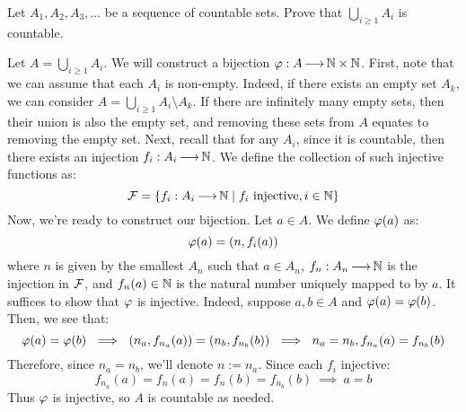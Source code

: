 \label{q1}
\begin{qu}[num=1]
    Let $ A_{1}, A_{2}, A_{3}, \dots $ be a sequence of countable sets.
    Prove that $ \bigcup_{i \geq 1} A_{i} $ is countable.
\end{qu}

\begin{soln}
    Let $ A = \bigcup_{i \geq 1} A_{i} $. 
    We will construct a bijection $ \operatorname{\varphi} : A \operatorname{\longrightarrow} \mathbb{N} \times \mathbb{N} $.
    \vsp
    First, note that we can assume that each $ A_{i} $ is non-empty.
    Indeed, if there exists an empty set $ A_{k} $, we can consider
    $ A = \bigcup_{i \geq 1} A_{i} \setminus A_{k} $.
    If there are infinitely many empty sets, then their union is also the empty
    set, and removing these sets from $ A $ equates to removing the empty set.
    \vsp
    Next, recall that for any $ A_{i} $, since it is countable,
    then there exists an injection $ f_{i} : A_{i} \operatorname{\longrightarrow} \mathbb{N} $.
    We define the collection of such injective functions as:
    \begin{equation*}
        \mathcal{F} = \left\{{f_{i} : A_{i} \operatorname{\longrightarrow} \mathbb{N} \mid
        f_{i} \textrm{ injective}, i \in \mathbb{N}}\right\}
    \end{equation*}
    Now, we're ready to construct our bijection.
    Let $ a \in A $. We define $ \operatorname{\varphi}(a) $ as:
    \begin{equation*}
        \operatorname{\varphi}(a) = (n, f_{i}(a))
    \end{equation*}
    where $ n $ is given by the smallest $ A_{n} $ such that $ a \in A_{n} $, 
    $ f_{n} : A_{n} \operatorname{\longrightarrow} \mathbb{N} $ is the injection in $ \mathcal{F} $, 
    and $ f_{n}(a) \in \mathbb{N} $ is the natural number uniquely mapped to by
    $ a $. It suffices to show that $ \operatorname{\varphi} $ is injective. \vsp
    Indeed, suppose $ a, b \in A $ and $ \operatorname{\varphi}(a) = \operatorname{\varphi}(b) $.
    Then, we see that:
    \begin{equation*}
        \vphi(a) = \vphi(b) \ \implies \ (n_{a}, f_{n_{a}}(a)) =
        (n_{b}, f_{n_{b}}(b)) \ \implies \ n_{a} = n_{b} , f_{n_{a}}(a)
        = f_{n_{b}}(b)
    \end{equation*}
    Therefore, since $ n_{a} = n_{b} $, we'll denote $ n := n_{a} $.
    Since each $ f_{i} $ injective:
    \begin{equation*}
        f_{n_{a}}(a) = f_{n}(a) = f_{n}(b) = f_{n_{b}}(b) \ \implies \ a = b
    \end{equation*}
    Thus $ \operatorname{\varphi} $ is injective, so $ A $ is countable as needed.
\end{soln}


